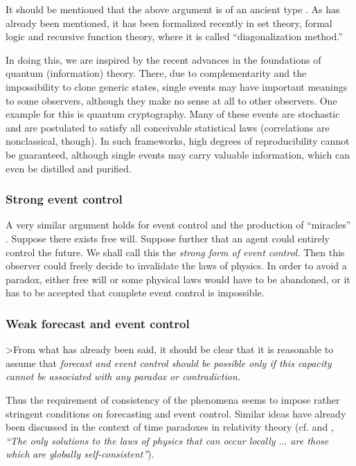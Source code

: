 It should be mentioned that the above argument is of an
ancient type \cite{martin}.
As has already been mentioned,
it has been formalized recently in set theory, formal
logic and recursive function theory, where it is called
``diagonalization method.''

In doing this, we are inspired by the recent advances in the foundations
of quantum (information) theory.
There, due to complementarity and the impossibility to clone
generic states, single events may have important meanings to
some observers, although they make no sense at all to other observers.
One example for this is quantum cryptography.
Many of these events are stochastic and are postulated to
satisfy all conceivable statistical laws (correlations are nonclassical,
though).
In such frameworks, high degrees of reproducibility cannot be
guaranteed, although single events may carry valuable information,
which can even be distilled and purified.

\subsubsection*{Strong event control}
A very similar argument holds for event control and the production of
``miracles'' \cite{frank}.
Suppose there exists free will.
Suppose further that an agent could entirely control the future.
We shall call this the {\em strong form of event control.}
Then this observer could freely decide to invalidate the laws of physics.
In order to avoid a paradox,  either  free will or some
physical laws would have to be abandoned, or it has to be accepted that
complete event control is impossible.

\subsubsection*{Weak forecast and event control}
>From what has already been said, it should be clear that
it is reasonable to assume that {\em forecast and event control should be possible
only if this capacity cannot be associated with any paradox or contradiction.}

Thus the requirement of consistency of the phenomena seems to impose
rather stringent conditions on  forecasting and
event control. Similar ideas have  already been discussed in the context
of time paradoxes in relativity theory (cf. \cite{friedetal} and
\cite[p. 272]{nahin}, {\em ``The only solutions to the laws of physics
that can occur locally $\ldots$ are those which are globally
self-consistent''}).


